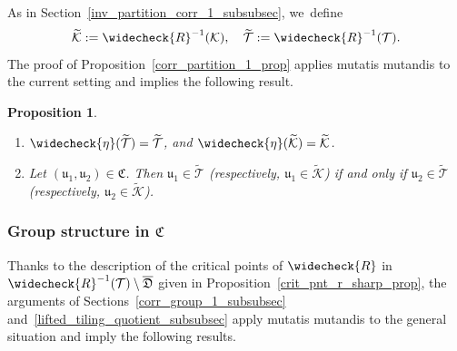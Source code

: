 \documentclass[JEP,XML,SOM,Unicode,NoFloatCountersInSection,published]{cedram}
\newtheorem{proposition}[lemma]{Proposition}
\theoremstyle{definition}
\theoremstyle{remark}
\newcommand{\cT}{\mathcal{T}}
\newcommand{\cK}{\mathcal{K}}
\begin{document}
As in Section~\ref{inv_partition_corr_1_subsubsec}, we~define
\[
\widetilde{\mathcal{K}}:=\widecheck{R}^{-1}(\mathcal{K}),\quad \widetilde{\mathcal{T}}:= \widecheck{R}^{-1}(\mathcal{T}).
\]
The proof of Proposition~\ref{corr_partition_1_prop} applies mutatis mutandis to the current setting and implies the following result.

\skpt
\begin{proposition}\label{corr_partition_2_prop}
\begin{enumerate}
\item $\widecheck{\eta}(\widetilde{\mathcal{T}})=\widetilde{\mathcal{T}}$, and $\widecheck{\eta}(\widetilde{\cK})=\widetilde{\cK}$.

\item Let $(\mathfrak{u}_1,\mathfrak{u}_2)\in\mathfrak{C}$. Then $\mathfrak{u}_1\in\widetilde{\mathcal{T}}$ (respectively, $\mathfrak{u}_1\in\widetilde{\mathcal{K}}$) if and only if $\mathfrak{u}_2\in\widetilde{\mathcal{T}}$ (respectively, $\mathfrak{u}_2\in\widetilde{\mathcal{K}}$).
\end{enumerate}
\end{proposition}

\subsubsection{Group structure in $\mathfrak{C}$}\label{corr_group_2_subsubsec}

Thanks to the description of the critical points of $\widecheck{R}$ in $\widecheck{R}^{-1}(\cT)\setminus\overline{\mathfrak{D}}$ given in Proposition~\ref{crit_pnt_r_sharp_prop}, the arguments of Sections~\ref{corr_group_1_subsubsec} and~\ref{lifted_tiling_quotient_subsubsec} apply mutatis mutandis to the general situation and imply the following results.
\end{document}
